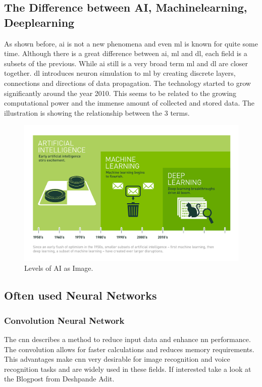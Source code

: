 \documentclass[10pt,a4paper]{article}
\begin{document}
\subsection{The Difference between AI, Machinelearning, Deeplearning}
\label{sec:AIMachinelearningDeeplearning}
As shown before, \gls{ai} is not a new phenomena and even \gls{ml} is known for quite some time. Although there is a great difference between \gls{ai}, \gls{ml} and \gls{dl}, each field is a subsets of the previous. While \gls{ai} still is a very broad term \gls{ml} and \gls{dl} are closer together. \gls{dl} introduces neuron simulation to \gls{ml} by creating discrete layers, connections and directions of data propagation\cite{MichaelCopeland2016}. The technology started to grow significantly around the year 2010. This seems to be related to the growing computational power and the immense amount of collected and stored data\cite{MichaelCopeland2016}. The illustration is showing the relationship between the 3 terms.
\begin{figure}[H]
	\includegraphics[width=\textwidth, height=\textheight, keepaspectratio]{Deep_Learning_Icons_R5.png}
	\caption{Levels of AI as Image\cite{MichaelCopeland2016}.}
\end{figure}

\subsection{Often used Neural Networks}
\subsubsection{Convolution Neural Network}
The \gls{cnn} describes a method to reduce input data and enhance \gls{nn} performance. The convolution allows for faster calculations and reduces memory requirements. This advantages make \gls{cnn} very desirable for image recognition and voice recognition tasks and are widely used in these fields. If interested take a look at the Blogpost from Deshpande Adit\citep{DeshpandeAdit2016}.
\end{document}

